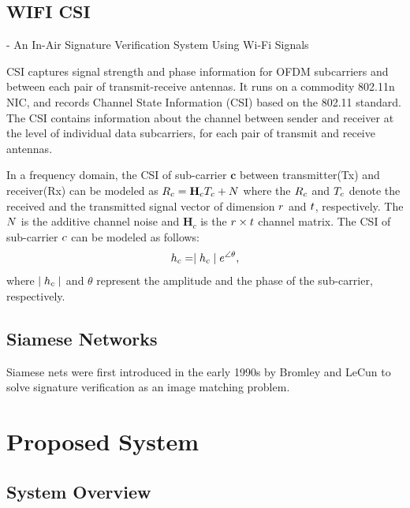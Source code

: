 \documentclass[runningheads]{llncs}
\begin{document}
\subsection{WIFI CSI}
- An In-Air Signature Verification System Using Wi-Fi Signals 

CSI captures signal strength and phase information for OFDM subcarriers and between each pair of transmit-receive antennas.
It runs on a commodity 802.11n NIC, and records Channel State Information (CSI) based on the 802.11 standard.
The CSI contains information about the channel between sender and receiver at the level of individual data subcarriers, for each pair of transmit and receive antennas.

In a frequency domain, the CSI of sub-carrier $\mathbf{c}$ between transmitter(Tx) and receiver(Rx) can be modeled as 
$\mathnormal{R}_{c} = \mathbf{H}_{c}\mathnormal{T}_{c} +\mathnormal{N}$ where the $\mathnormal{R}_{c}$ and $\mathnormal{T}_{c}$  denote the received and the transmitted signal vector of dimension $\mathnormal{r}$ and $\mathnormal{t}$, respectively. The $\mathnormal{N}$ is the additive channel noise and $\mathbf{H}_{c}$ is the $\mathnormal{r}\times\mathnormal{t}$ channel matrix. The CSI of sub-carrier $\mathnormal{c}$ can be modeled as follows:
\begin{equation}
    \mathnormal{h}_{c} = \mid\mathnormal{h}_{c}\mid\mathnormal{e}^{\angle\theta},
\end{equation}
where $\mid\mathnormal{h}_{c}\mid$ and $\theta$ represent the amplitude and the phase of the sub-carrier, respectively.

\subsection{Siamese Networks}
Siamese nets were first introduced in the early 1990s by Bromley and LeCun to solve signature verification as an image matching problem.\cite{koch2015siamese}



\section{Proposed System}

\subsection{System Overview}
\end{document}
